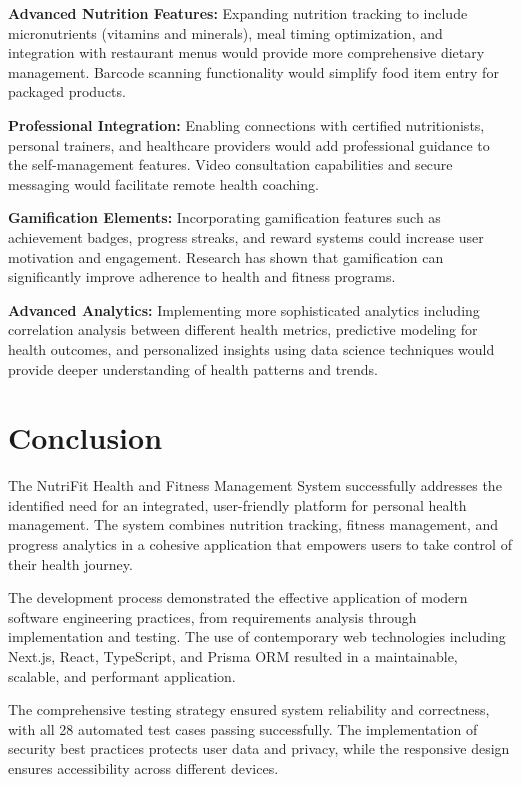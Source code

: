 \textbf{Advanced Nutrition Features:} Expanding nutrition tracking to include micronutrients (vitamins and minerals), meal timing optimization, and integration with restaurant menus would provide more comprehensive dietary management. Barcode scanning functionality would simplify food item entry for packaged products.

\textbf{Professional Integration:} Enabling connections with certified nutritionists, personal trainers, and healthcare providers would add professional guidance to the self-management features. Video consultation capabilities and secure messaging would facilitate remote health coaching.

\textbf{Gamification Elements:} Incorporating gamification features such as achievement badges, progress streaks, and reward systems could increase user motivation and engagement. Research has shown that gamification can significantly improve adherence to health and fitness programs.

\textbf{Advanced Analytics:} Implementing more sophisticated analytics including correlation analysis between different health metrics, predictive modeling for health outcomes, and personalized insights using data science techniques would provide deeper understanding of health patterns and trends.

\section{Conclusion}

The NutriFit Health and Fitness Management System successfully addresses the identified need for an integrated, user-friendly platform for personal health management. The system combines nutrition tracking, fitness management, and progress analytics in a cohesive application that empowers users to take control of their health journey.

The development process demonstrated the effective application of modern software engineering practices, from requirements analysis through implementation and testing. The use of contemporary web technologies including Next.js, React, TypeScript, and Prisma ORM resulted in a maintainable, scalable, and performant application.

The comprehensive testing strategy ensured system reliability and correctness, with all 28 automated test cases passing successfully. The implementation of security best practices protects user data and privacy, while the responsive design ensures accessibility across different devices.

